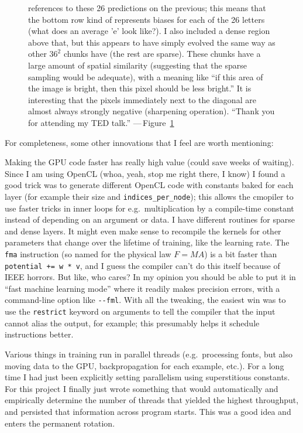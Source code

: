 \documentclass[twocolumn]{article}
\begin{document}
\begin{figure}[ht]
{    references to these 26 predictions on the previous; this means
    that the bottom row kind of represents biases for each of the 26
    letters (what does an average 'e' look like?). I also included a
    dense region above that, but this appears to have simply evolved
    the same way as other $36^2$ chunks have (the rest are sparse).
    These chunks have a large amount of spatial similarity (suggesting
    that the sparse sampling would be adequate), with a meaning like
    ``if this area of the image is bright, then this pixel should
    be less bright.'' It is interesting that the pixels immediately
    next to the diagonal are almost always strongly negative
    (sharpening operation). ``Thank you for attending my TED talk.''
    ---\,Figure~\ref{fig:lastlayer}}
  \label{fig:lastlayer}
\end{figure}

For completeness, some other innovations that I feel are worth
mentioning:

Making the GPU code faster has really high value (could save weeks of
waiting). Since I am using OpenCL (whoa, yeah, stop me right there, I
know) I found a good trick was to generate different OpenCL code with
constants baked for each layer (for example their size and
\verb+indices_per_node+); this allows the cmopiler to use faster
tricks in inner loops for e.g.~multiplication by a compile-time constant
instead of depending on an argument or data. I have different routines
for sparse and dense layers. It might even make sense to recompile the
kernels for other parameters that change over the lifetime of
training, like the learning rate. The {\tt fma} instruction (so named
for the physical law $F=MA$) is a bit faster than
\verb|potential += w * v|, and I guess the compiler can't do this
itself because of IEEE horrors. But like, who cares? In my opinion you
should be able to put it in ``fast machine learning mode'' where it
readily makes precision errors, with a command-line option like
\verb+--fml+. With all the tweaking, the easiest win was to use the
{\tt restrict} keyword on arguments to tell the compiler that the
input cannot alias the output, for example; this presumably helps
it schedule instructions better.

Various things in training run in parallel threads (e.g.~processing
fonts, but also moving data to the GPU, backpropagation for each
example, etc.). For a long time I had just been explicitly setting
parallelism using superstitious constants. For this project I finally
just wrote something that would automatically and empirically
determine the number of threads that yielded the highest throughput,
and persisted that information across program starts. This was a
good idea and enters the permanent rotation.
\end{document}
